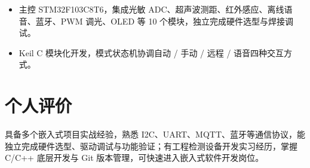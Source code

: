 \documentclass[10pt,a4paper]{article}
\begin{document}
\begin{itemize}[leftmargin=1.5em, itemsep=2pt, parsep=0pt, topsep=2pt]
    \item 主控 STM32F103C8T6，集成光敏 ADC、超声波测距、红外感应、离线语音、蓝牙、PWM 调光、OLED 等 10 个模块，独立完成硬件选型与焊接调试。
    \item Keil C 模块化开发，模式状态机协调自动 / 手动 / 远程 / 语音四种交互方式。
\end{itemize}

\vspace{0.1em}

\section{\faUser\hspace{0.4em}个人评价}

具备多个嵌入式项目实战经验，熟悉 I2C、UART、MQTT、蓝牙等通信协议，能独立完成硬件选型、驱动调试与功能验证；有工程检测设备开发实习经历，掌握 C/C++ 底层开发与 Git 版本管理，可快速进入嵌入式软件开发岗位。
\end{document}
